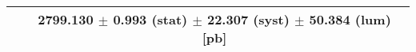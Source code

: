 \begin{tabular}{lc}
\hline
                               & 2799.130 $\pm$ 0.993 (stat) $\pm$ 22.307 (syst) $\pm$ 50.384 (lum) [pb]  \\
\hline
\end{tabular}
